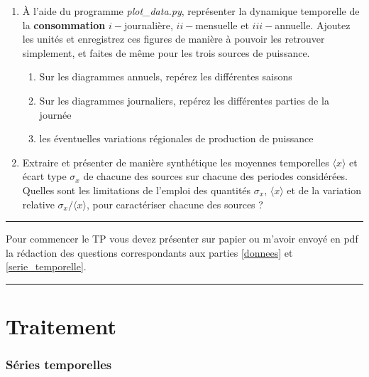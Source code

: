 \documentclass[12pt,a4,french]{article}
\newcommand{\tmtextbf}[1]{{\bfseries{#1}}}
\newcommand{\tmtextit}[1]{{\itshape{#1}}}
\begin{document}
\begin{enumerate}
	\item À l'aide du programme \tmtextit{plot\_data.py}, représenter la
	dynamique temporelle de la \tmtextbf{consommation} $i-$journalière, $ii-$mensuelle
	et $iii-$annuelle. Ajoutez les unités et enregistrez ces figures de manière à
	pouvoir les retrouver simplement, et faites de même pour les trois sources de puissance.
	
	\begin{enumerate}
		\item Sur les diagrammes annuels, repérez les différentes saisons
		
		\item Sur les diagrammes journaliers, repérez les différentes parties de
		la journée
		
		\item les éventuelles variations régionales de production de puissance
	\end{enumerate}
	\item Extraire et présenter de manière synthétique les moyennes temporelles $\langle x \rangle$ et écart type $\sigma_x$ de chacune des sources sur chacune des periodes considérées. \newline
	Quelles sont les limitations de l'emploi des quantités $\sigma_x $, $ \langle
	x \rangle$ et de la variation relative $\sigma_x / \langle
	x \rangle$, pour caractériser chacune des sources ?
\end{enumerate}

\vspace{1cm}
\hrule
\vspace{0.5cm}
Pour commencer le TP vous devez présenter sur papier ou m'avoir envoyé en pdf la rédaction des questions correspondants aux parties \ref{donnees} et \ref{serie_temporelle}.
\vspace{0.5cm}
\hrule

\newpage
\part{Traitement}

\section{Séries temporelles}
\end{document}
